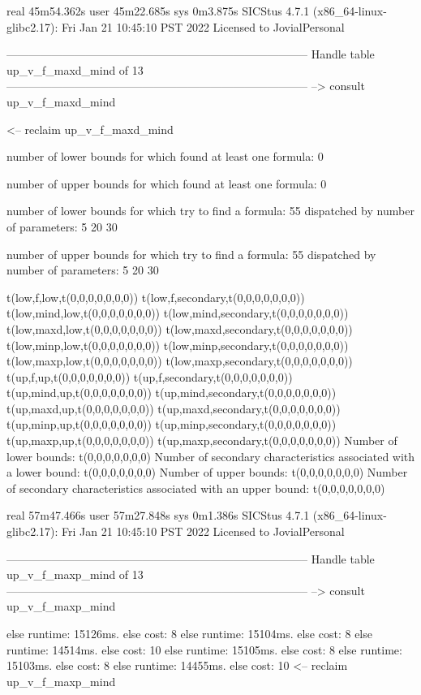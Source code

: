 real	45m54.362s
user	45m22.685s
sys	0m3.875s
SICStus 4.7.1 (x86_64-linux-glibc2.17): Fri Jan 21 10:45:10 PST 2022
Licensed to JovialPersonal


--------------------------------------------------------------------------------
Handle table up_v_f_maxd_mind of 13
--------------------------------------------------------------------------------
--> consult up_v_f_maxd_mind

<-- reclaim up_v_f_maxd_mind

number of lower bounds for which found at least one formula: 0

number of upper bounds for which found at least one formula: 0

number of lower bounds for which try to find a formula: 55
dispatched by number of parameters: 5  20  30

number of upper bounds for which try to find a formula: 55
dispatched by number of parameters: 5  20  30

t(low,f,low,t(0,0,0,0,0,0,0))
t(low,f,secondary,t(0,0,0,0,0,0,0))
t(low,mind,low,t(0,0,0,0,0,0,0))
t(low,mind,secondary,t(0,0,0,0,0,0,0))
t(low,maxd,low,t(0,0,0,0,0,0,0))
t(low,maxd,secondary,t(0,0,0,0,0,0,0))
t(low,minp,low,t(0,0,0,0,0,0,0))
t(low,minp,secondary,t(0,0,0,0,0,0,0))
t(low,maxp,low,t(0,0,0,0,0,0,0))
t(low,maxp,secondary,t(0,0,0,0,0,0,0))
t(up,f,up,t(0,0,0,0,0,0,0))
t(up,f,secondary,t(0,0,0,0,0,0,0))
t(up,mind,up,t(0,0,0,0,0,0,0))
t(up,mind,secondary,t(0,0,0,0,0,0,0))
t(up,maxd,up,t(0,0,0,0,0,0,0))
t(up,maxd,secondary,t(0,0,0,0,0,0,0))
t(up,minp,up,t(0,0,0,0,0,0,0))
t(up,minp,secondary,t(0,0,0,0,0,0,0))
t(up,maxp,up,t(0,0,0,0,0,0,0))
t(up,maxp,secondary,t(0,0,0,0,0,0,0))
Number of lower bounds:                                             t(0,0,0,0,0,0,0)
Number of secondary characteristics associated with a lower bound:  t(0,0,0,0,0,0,0)
Number of upper bounds:                                             t(0,0,0,0,0,0,0)
Number of secondary characteristics associated with an upper bound: t(0,0,0,0,0,0,0)

real	57m47.466s
user	57m27.848s
sys	0m1.386s
SICStus 4.7.1 (x86_64-linux-glibc2.17): Fri Jan 21 10:45:10 PST 2022
Licensed to JovialPersonal


--------------------------------------------------------------------------------
Handle table up_v_f_maxp_mind of 13
--------------------------------------------------------------------------------
--> consult up_v_f_maxp_mind

else runtime: 15126ms. else cost: 8
else runtime: 15104ms. else cost: 8
else runtime: 14514ms. else cost: 10
else runtime: 15105ms. else cost: 8
else runtime: 15103ms. else cost: 8
else runtime: 14455ms. else cost: 10
<-- reclaim up_v_f_maxp_mind


